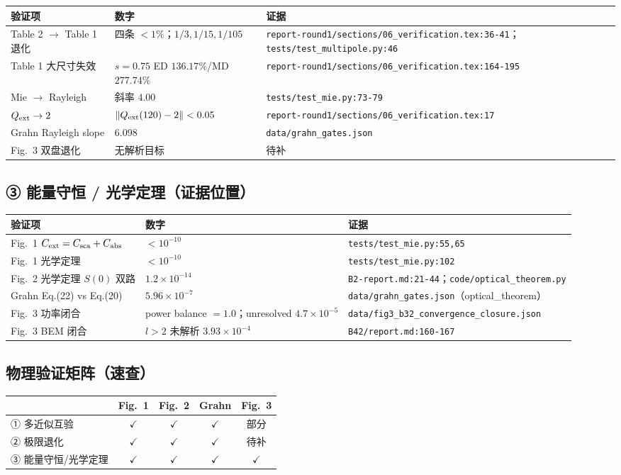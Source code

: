 \begin{longtable}{p{4.8cm}p{5.4cm}p{3.6cm}}
\toprule
验证项 & 数字 & 证据 \\
\midrule
\endhead
Table 2 $\to$ Table 1 退化 & 四条 $<1\%$；$1/3,1/15,1/105$ & \texttt{report-round1/sections/06\_verification.tex:36-41}；\texttt{tests/test\_multipole.py:46} \\
Table 1 大尺寸失效 & $s=0.75$ ED $136.17\%$/MD $277.74\%$ & \texttt{report-round1/sections/06\_verification.tex:164-195} \\
Mie $\to$ Rayleigh & 斜率 $4.00$ & \texttt{tests/test\_mie.py:73-79} \\
$Q_{\rm ext}\to2$ & $\|Q_{\rm ext}(120)-2\|<0.05$ & \texttt{report-round1/sections/06\_verification.tex:17} \\
Grahn Rayleigh slope & $6.098$ & \texttt{data/grahn\_gates.json} \\
Fig.~3 双盘退化 & 无解析目标 & 待补 \\
\bottomrule
\end{longtable}

\subsection{③ 能量守恒 / 光学定理（证据位置）}

\begin{longtable}{p{4.8cm}p{5.4cm}p{3.6cm}}
\toprule
验证项 & 数字 & 证据 \\
\midrule
\endhead
Fig.~1 $C_{\rm ext}=C_{\rm sca}+C_{\rm abs}$ & $<10^{-10}$ & \texttt{tests/test\_mie.py:55,65} \\
Fig.~1 光学定理 & $<10^{-10}$ & \texttt{tests/test\_mie.py:102} \\
Fig.~2 光学定理 $S(0)$ 双路 & $1.2\times10^{-14}$ & \texttt{B2-report.md:21-44}；\texttt{code/optical\_theorem.py} \\
Grahn Eq.(22) vs Eq.(20) & $5.96\times10^{-7}$ & \texttt{data/grahn\_gates.json}（optical\_theorem） \\
Fig.~3 功率闭合 & power balance $=1.0$；unresolved $4.7\times10^{-5}$ & \texttt{data/fig3\_b32\_convergence\_closure.json} \\
Fig.~3 BEM 闭合 & $l>2$ 未解析 $3.93\times10^{-4}$ & \texttt{B42/report.md:160-167} \\
\bottomrule
\end{longtable}

\subsection{物理验证矩阵（速查）}

\begin{table}[H]
\centering
\begin{tabular}{lcccc}
\toprule
& Fig.~1 & Fig.~2 & Grahn & Fig.~3 \\
\midrule
① 多近似互验 & $\checkmark$ & $\checkmark$ & $\checkmark$ & 部分 \\
② 极限退化 & $\checkmark$ & $\checkmark$ & $\checkmark$ & 待补 \\
③ 能量守恒/光学定理 & $\checkmark$ & $\checkmark$ & $\checkmark$ & $\checkmark$ \\
\bottomrule
\end{tabular}
\end{table}
